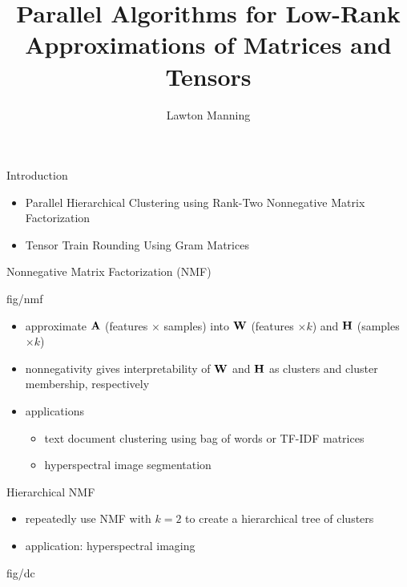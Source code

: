 \documentclass{beamer}
\title{Parallel Algorithms for Low-Rank Approximations of Matrices and Tensors}
\author{
    Lawton Manning
}
\begin{document}
\frame{\titlepage}

\begin{frame}{Introduction}
    \begin{itemize}
        \item Parallel Hierarchical Clustering using Rank-Two Nonnegative Matrix Factorization
        \item Tensor Train Rounding Using Gram Matrices
    \end{itemize}
\end{frame}

\begin{frame}{Nonnegative Matrix Factorization (NMF)}
    \begin{adjustbox}{max totalsize={.4\textwidth}{.5\textheight},center}
    {fig/nmf}
    \end{adjustbox}
    \begin{itemize}
        \item approximate $\M{A}$ (features $\times$ samples) into $\M{W}$ (features $\times k$) and $\M{H}$ (samples $\times k$)
        \item nonnegativity gives interpretability of $\M{W}$ and $\M{H}$ as clusters and cluster membership, respectively
        \item applications
            \begin{itemize}
                \item text document clustering using bag of words or TF-IDF matrices
                \item hyperspectral image segmentation
            \end{itemize}
    \end{itemize}
\end{frame}

\begin{frame}{Hierarchical NMF}
    \begin{itemize}
        \item repeatedly use NMF with $k = 2$ to create a hierarchical tree of clusters
        \item application: hyperspectral imaging
    \end{itemize}
    \begin{adjustbox}{max totalsize={.7\textwidth}{.6\textheight},center}
    {fig/dc}
    \end{adjustbox}
\end{frame}
\end{document}
